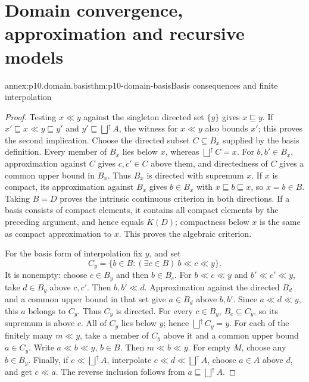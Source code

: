 \section{Domain convergence, approximation and recursive models}

\begin{annexitem}{annex:p10.domain.basis}{thm:p10-domain-basis}{Basis consequences and finite interpolation}
\begin{proof}
Testing \(x\ll y\) against the singleton directed set \(\{y\}\)
gives \(x\sqsubseteq y\). If \(x'\sqsubseteq x\ll y\sqsubseteq y'\)
and \(y'\sqsubseteq\bigsqcup^{\uparrow}A\), the witness for \(x\ll y\)
also bounds \(x'\); this proves the second implication.
Choose the directed subset \(C\subseteq B_x\) supplied by the basis
definition. Every member of \(B_x\) lies below \(x\), whereas
\(\bigsqcup^{\uparrow}C=x\). For \(b,b'\in B_x\), approximation
against \(C\) gives \(c,c'\in C\) above them, and directedness of
\(C\) gives a common upper bound in \(B_x\). Thus \(B_x\) is
directed with supremum \(x\). If \(x\) is compact, its approximation
against \(B_x\) gives \(b\in B_x\) with \(x\sqsubseteq b\sqsubseteq x\),
so \(x=b\in B\). Taking \(B=D\) proves the intrinsic continuous
criterion in both directions. If a basis consists of compact elements,
it contains all compact elements by the preceding argument, and hence
equals \(K(D)\); compactness below \(x\) is the same as compact
approximation to \(x\). This proves the algebraic criterion.

For the basis form of interpolation fix \(y\), and set
\[
 C_y=\{b\in B:(\exists c\in B)\ b\ll c\ll y\}.
\]
It is nonempty: choose \(c\in B_y\) and then \(b\in B_c\).
For \(b\ll c\ll y\) and \(b'\ll c'\ll y\), take
\(d\in B_y\) above \(c,c'\). Then \(b,b'\ll d\).
Approximation against the directed \(B_d\) and a common upper
bound in that set give \(a\in B_d\) above \(b,b'\).
Since \(a\ll d\ll y\), this \(a\) belongs to \(C_y\).
Thus \(C_y\) is directed. For every \(c\in B_y\),
\(B_c\subseteq C_y\), so its supremum is above \(c\).
All of \(C_y\) lies below \(y\); hence
\(\bigsqcup^{\uparrow}C_y=y\).
For each of the finitely many \(m\ll y\), take a member of
\(C_y\) above it and a common upper bound \(a\in C_y\).
Write \(a\ll b\ll y\), \(b\in B\). Then \(m\ll b\ll y\).
For empty \(M\), choose any \(b\in B_y\).
Finally, if \(c\ll\bigsqcup^{\uparrow}A\), interpolate
\(c\ll d\ll\bigsqcup^{\uparrow}A\), choose \(a\in A\) above
\(d\), and get \(c\ll a\). The reverse inclusion follows from
\(a\sqsubseteq\bigsqcup^{\uparrow}A\).
\end{proof}
\end{annexitem}

